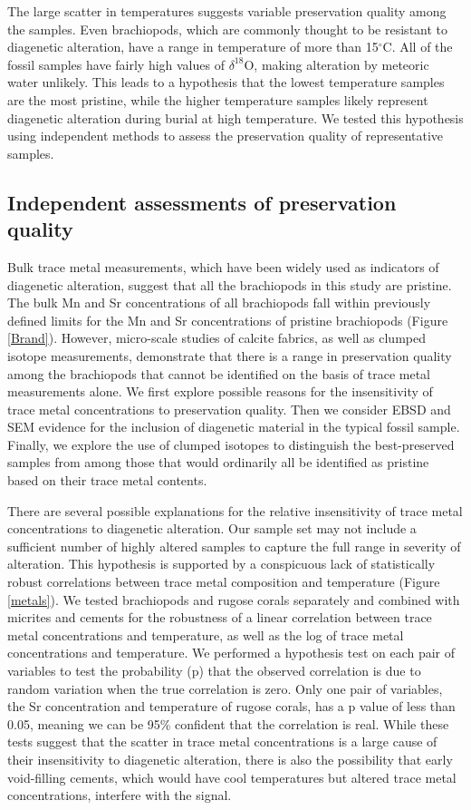 \documentclass{article}
\newcommand{\deltao}{$\delta^{18}$}
\newcommand{\degrees}{$^{\circ}$}
\begin{document}
The large scatter in temperatures suggests variable preservation quality among the samples. Even brachiopods, which are commonly thought to be resistant to diagenetic alteration, have a range in temperature of more than 15\degrees C. All of the fossil samples have fairly high values of \deltao O, making alteration by meteoric water unlikely. This leads to a hypothesis that the lowest temperature samples are the most pristine, while the higher temperature samples likely represent diagenetic alteration during burial at high temperature. We tested this hypothesis using independent methods to assess the preservation quality of representative samples. 

\subsection{Independent assessments of preservation quality}

Bulk trace metal measurements, which have been widely used as indicators of diagenetic alteration, suggest that all the brachiopods in this study are pristine. The bulk Mn and Sr concentrations of all brachiopods fall within previously defined limits for the Mn and Sr concentrations of pristine brachiopods (Figure \ref{Brand}). However, micro-scale studies of calcite fabrics, as well as clumped isotope measurements, demonstrate that there is a range in preservation quality among the brachiopods that cannot be identified on the basis of trace metal measurements alone. We first explore possible reasons for the insensitivity of trace metal concentrations to preservation quality. Then we consider EBSD and SEM evidence for the inclusion of diagenetic material in the typical fossil sample. Finally, we explore the use of clumped isotopes to distinguish the best-preserved samples from among those that would ordinarily all be identified as pristine based on their trace metal contents.  

There are several possible explanations for the relative insensitivity of trace metal concentrations to diagenetic alteration. Our sample set may not include a sufficient number of highly altered samples to capture the full range in severity of alteration. This hypothesis is supported by a conspicuous lack of statistically robust correlations between trace metal composition and temperature (Figure \ref{metals}). We tested brachiopods and rugose corals separately and combined with micrites and cements for the robustness of a linear correlation between trace metal concentrations and temperature, as well as the log of trace metal concentrations and temperature. We performed a hypothesis test on each pair of variables to test the probability (p) that the observed correlation is due to random variation when the true correlation is zero. Only one pair of variables, the Sr concentration and temperature of rugose corals, has a p value of less than 0.05, meaning we can be 95\% confident that the correlation is real. While these tests suggest that the scatter in trace metal concentrations is a large cause of their insensitivity to diagenetic alteration, there is also the possibility that early void-filling cements, which would have cool temperatures but altered trace metal concentrations, interfere with the signal. 
\end{document}
